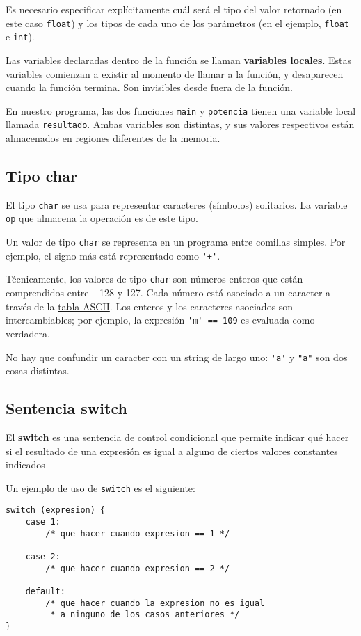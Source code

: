 Es necesario especificar explícitamente cuál será el tipo del valor
retornado (en este caso \lstinline!float!) y los tipos de cada uno de
los parámetros (en el ejemplo, \lstinline!float! e \lstinline!int!).

Las variables declaradas dentro de la función se llaman
\textbf{variables locales}. Estas variables comienzan a existir al
momento de llamar a la función, y desaparecen cuando la función termina.
Son invisibles desde fuera de la función.

En nuestro programa, las dos funciones \lstinline!main! y
\lstinline!potencia! tienen una variable local llamada
\lstinline!resultado!. Ambas variables son distintas, y sus valores
respectivos están almacenados en regiones diferentes de la memoria.

\subsection{Tipo char}

El tipo \lstinline!char! se usa para representar caracteres (símbolos)
solitarios. La variable \lstinline!op! que almacena la operación es de
este tipo.

Un valor de tipo \lstinline!char! se representa en un programa entre
comillas simples. Por ejemplo, el signo más está representado como
\lstinline!'+'!.

Técnicamente, los valores de tipo \lstinline!char! son números enteros
que están comprendidos entre −128 y 127. Cada número está asociado a un
caracter a través de la
\href{http://es.wikipedia.org/wiki/C\%C3\%B3digo\_ASCII\#Caracteres\_imprimibles\_ASCII}{tabla
ASCII}. Los enteros y los caracteres asociados son intercambiables; por
ejemplo, la expresión \lstinline!'m' == 109! es evaluada como verdadera.

No hay que confundir un caracter con un string de largo uno:
\lstinline!'a'! y \lstinline!"a"! son dos cosas distintas.

\subsection{Sentencia switch}

El \textbf{switch} es una sentencia de control condicional que permite
indicar qué hacer si el resultado de una expresión es igual a alguno de
ciertos valores constantes indicados

Un ejemplo de uso de \lstinline!switch! es el siguiente:

\begin{lstlisting}
switch (expresion) {
    case 1:
        /* que hacer cuando expresion == 1 */

    case 2:
        /* que hacer cuando expresion == 2 */

    default:
        /* que hacer cuando la expresion no es igual
         * a ninguno de los casos anteriores */
}
\end{lstlisting}

